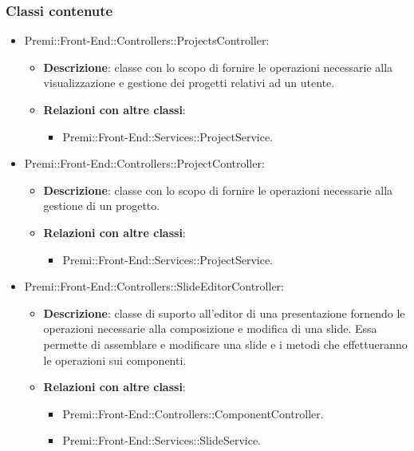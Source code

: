 	\subsubsection{Classi contenute}
		\begin{itemize}

		 \item Premi::Front-End::Controllers::ProjectsController:
			\begin{itemize}
				\item \textbf{Descrizione}: classe con lo scopo di fornire le operazioni necessarie alla visualizzazione e gestione dei progetti relativi ad un utente.
				\item \textbf{Relazioni con altre classi}:
				\begin{itemize}
					\item Premi::Front-End::Services::ProjectService.
				\end{itemize}
			\end{itemize}
		\item  Premi::Front-End::Controllers::ProjectController: 
			 \begin{itemize}
				\item \textbf{Descrizione}: classe con lo scopo di fornire le operazioni necessarie alla gestione di un progetto.
				\item \textbf{Relazioni con altre classi}:
				\begin{itemize}
					\item Premi::Front-End::Services::ProjectService.
				\end{itemize}
			  \end{itemize}
		\item  Premi::Front-End::Controllers::SlideEditorController: 
			 \begin{itemize}
				\item \textbf{Descrizione}: classe di suporto all'editor di una presentazione fornendo le operazioni necessarie alla composizione e modifica di una slide. Essa permette di assemblare e modificare una \gls{slide} e i metodi che effettueranno le operazioni sui componenti.
				\item \textbf{Relazioni con altre classi}:
				\begin{itemize}
					\item Premi::Front-End::Controllers::ComponentController.
					\item Premi::Front-End::Services::SlideService.
				\end{itemize}
			\end{itemize}

\end{itemize}
